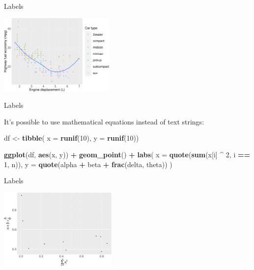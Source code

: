 \documentclass[ignorenonframetext,]{beamer}
\newenvironment{Shaded}{\begin{snugshade}}{\end{snugshade}}
\newcommand{\DataTypeTok}[1]{\textcolor[rgb]{0.13,0.29,0.53}{#1}}
\newcommand{\DecValTok}[1]{\textcolor[rgb]{0.00,0.00,0.81}{#1}}
\newcommand{\KeywordTok}[1]{\textcolor[rgb]{0.13,0.29,0.53}{\textbf{#1}}}
\newcommand{\NormalTok}[1]{#1}
\newcommand{\OperatorTok}[1]{\textcolor[rgb]{0.81,0.36,0.00}{\textbf{#1}}}
\newcommand{\StringTok}[1]{\textcolor[rgb]{0.31,0.60,0.02}{#1}}
\begin{document}
\begin{frame}{Labels}
\protect\hypertarget{labels-6}{}

\begin{center}\includegraphics[height=150px]{data-visualization_files/figure-beamer/unnamed-chunk-152-1} \end{center}

\end{frame}

\begin{frame}[fragile]{Labels}
\protect\hypertarget{labels-7}{}

It's possible to use mathematical equations instead of text strings:

\begin{Shaded}
\begin{Highlighting}[]
\NormalTok{df <-}\StringTok{ }\KeywordTok{tibble}\NormalTok{(}
  \DataTypeTok{x =} \KeywordTok{runif}\NormalTok{(}\DecValTok{10}\NormalTok{),}
  \DataTypeTok{y =} \KeywordTok{runif}\NormalTok{(}\DecValTok{10}\NormalTok{))}

\KeywordTok{ggplot}\NormalTok{(df, }\KeywordTok{aes}\NormalTok{(x, y)) }\OperatorTok{+}
\StringTok{  }\KeywordTok{geom_point}\NormalTok{() }\OperatorTok{+}
\StringTok{  }\KeywordTok{labs}\NormalTok{(}
    \DataTypeTok{x =} \KeywordTok{quote}\NormalTok{(}\KeywordTok{sum}\NormalTok{(x[i] }\OperatorTok{^}\StringTok{ }\DecValTok{2}\NormalTok{, i }\OperatorTok{==}\StringTok{ }\DecValTok{1}\NormalTok{, n)),}
    \DataTypeTok{y =} \KeywordTok{quote}\NormalTok{(alpha }\OperatorTok{+}\StringTok{ }\NormalTok{beta }\OperatorTok{+}\StringTok{ }\KeywordTok{frac}\NormalTok{(delta, theta))}
\NormalTok{  )}
\end{Highlighting}
\end{Shaded}

\end{frame}

\begin{frame}{Labels}
\protect\hypertarget{labels-8}{}

\begin{center}\includegraphics[height=150px]{data-visualization_files/figure-beamer/unnamed-chunk-154-1} \end{center}

\end{frame}
\end{document}
